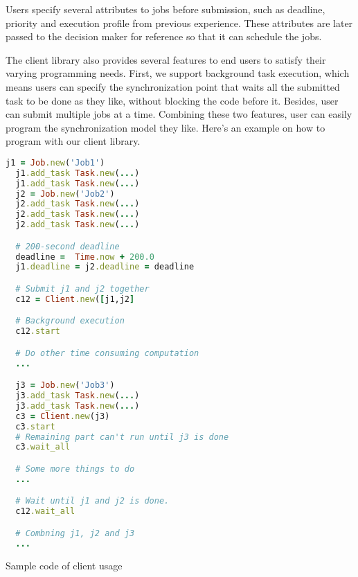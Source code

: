 Users specify several attributes to jobs before submission, such as
deadline, priority and execution profile from previous experience.
These attributes are later passed to the decision maker for reference so
that it can schedule the jobs.

The client library also provides several features to end users to
satisfy their varying programming needs.  First, we support background
task execution, which means users can specify the synchronization point
that waits all the submitted task to be done as they like, without
blocking the code before it.  Besides, user can submit multiple jobs at
a time.  Combining these two features, user can easily program the
synchronization model they like.  Here's an example on how to program
with our client library.

\begin{Code}

  \begin{lstlisting}[language=Ruby]
  j1 = Job.new('Job1')
  j1.add_task Task.new(...)
  j1.add_task Task.new(...)
  j2 = Job.new('Job2')
  j2.add_task Task.new(...)
  j2.add_task Task.new(...)
  j2.add_task Task.new(...)

  # 200-second deadline
  deadline =  Time.now + 200.0
  j1.deadline = j2.deadline = deadline

  # Submit j1 and j2 together
  c12 = Client.new([j1,j2]

  # Background execution
  c12.start

  # Do other time consuming computation
  ...

  j3 = Job.new('Job3')
  j3.add_task Task.new(...)
  j3.add_task Task.new(...)
  c3 = Client.new(j3)
  c3.start
  # Remaining part can't run until j3 is done
  c3.wait_all

  # Some more things to do
  ...

  # Wait until j1 and j2 is done.
  c12.wait_all

  # Combning j1, j2 and j3
  ...

  \end{lstlisting}
  \caption{Sample code of client usage}
\end{Code}

